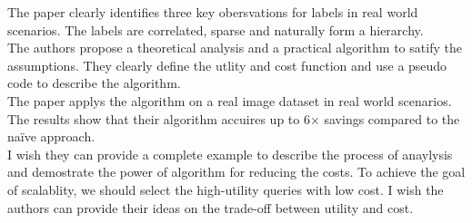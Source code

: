 \documentclass[a4paper]{article}
\begin{document}
The paper clearly identifies three key obersvations for labels in real world scenarios. The labels are correlated, sparse and naturally form a hierarchy.\\

The authors propose a theoretical analysis and a practical algorithm to satify the assumptions. They clearly define the utlity and cost function and use a pseudo code to describe the algorithm.\\

The paper applys the algorithm on a real image dataset in real world scenarios. The results show that their algorithm accuires up to 6× savings compared to the na\"{i}ve approach.\\

I wish they can provide a complete example to describe the process of anaylysis and demostrate the power of algorithm for reducing the costs. To achieve the goal of scalablity, we should select the high-utility queries with low cost. I wish the authors can provide their ideas on the trade-off between utility and cost.




\end{document}
